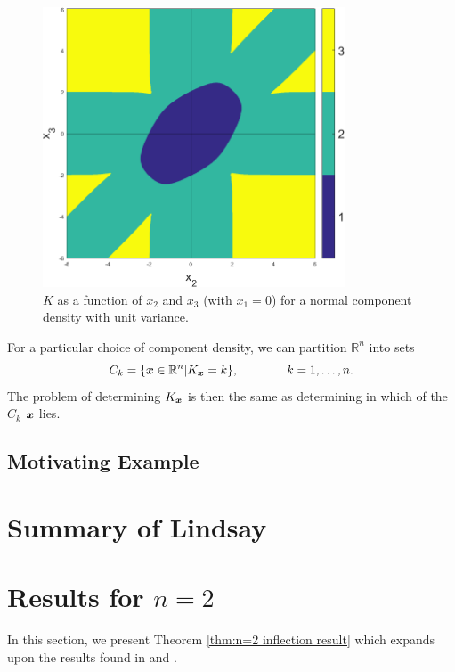 		\begin{figure}[ht]
			\centering
			\includegraphics[width=0.8\textwidth]{Sigma1n3res1024width6}
			\caption{$K$ as a function of $x_2$ and $x_3$ (with $x_1 = 0$) for a normal component density with unit variance.}\label{fig:n3phase}
		\end{figure}
		
		For a particular choice of component density, we can partition $\mathbb{R}^n$ into sets 
		\begin{equation}
			C_k = \{ {\bm{{x}}} \in \mathbb{R}^n | K_{{\bm{{x}}}} = k \}, \hspace{40pt} k = 1,\dots,n.
		\end{equation}
		The problem of determining $K_{{\bm{{x}}}}$ is then the same as determining in which of the $C_k$ ${\bm{{x}}}$ lies.

	\subsection{Motivating Example}

\section{Summary of Lindsay}

\section{Results for \texorpdfstring{$n = 2$}{n = 2}}
	In this section, we present Theorem \ref{thm:n=2 inflection result} which 
	expands upon the results found in \cite{Lindsay1983-tf} and \cite{Lindsay1983a-he}.

